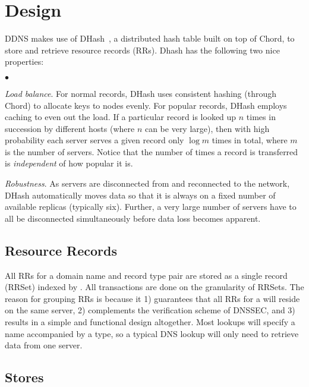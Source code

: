 \section{Design}

DDNS makes use of
DHash~\cite{cfs:sosp01}, a distributed hash table
built on top of Chord, to store
and retrieve resource records (RRs).
Dhash has the following two nice properties:

\begin{list}{$\bullet$}{}
\item {\em Load balance}.
For normal records, DHash uses consistent hashing 
(through Chord) to allocate keys to nodes evenly.
For popular records, DHash employs caching to even out
the load. If a particular record is looked up $n$ times
in succession by different hosts (where $n$ can be very large),
then with high probability each server serves a given record 
only $\log{m}$ times in total, 
where $m$ is the number of servers. Notice that
the number of times a record is transferred is 
{\it independent} of how popular it is. 

\item {\em Robustness}.
As servers are disconnected from and reconnected to the network,
DHash automatically moves data so that it is always on a fixed
number of available replicas (typically six).
Further, a very large number of servers have to
all be disconnected simultaneously before data loss
becomes apparent.
\end{list}

\subsection{Resource Records}

All RRs for a domain name and record type pair are stored 
as a single record (RRSet)
indexed by {\tt <domain name, type>}.
All transactions are done on the granularity
of RRSets. The reason for grouping RRs is because it 1)
guarantees that all RRs for a {\tt <domain name, type>} will reside on
the same server, 2) complements the verification scheme
of DNSSEC, and 3) results in a simple
and functional design altogether. Most lookups will specify
a name accompanied by a type, so a typical DNS lookup will only need
to retrieve data from one server.

\subsection{Stores}

